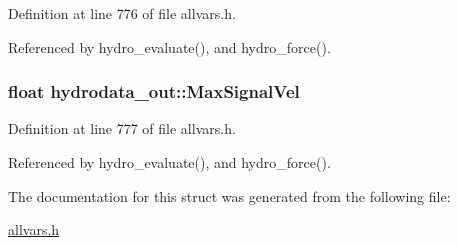 Definition at line 776 of file allvars.h.



Referenced by hydro\_\-evaluate(), and hydro\_\-force().

\hypertarget{structhydrodata__out_a6f4c65630e80c636a128d59e0afc4dad}{
\subsubsection[{MaxSignalVel}]{\setlength{\rightskip}{0pt plus 5cm}float {\bf hydrodata\_\-out::MaxSignalVel}}}
\label{structhydrodata__out_a6f4c65630e80c636a128d59e0afc4dad}


Definition at line 777 of file allvars.h.



Referenced by hydro\_\-evaluate(), and hydro\_\-force().



The documentation for this struct was generated from the following file:\begin{DoxyCompactItemize}
\item 
\hyperlink{allvars_8h}{allvars.h}\end{DoxyCompactItemize}
